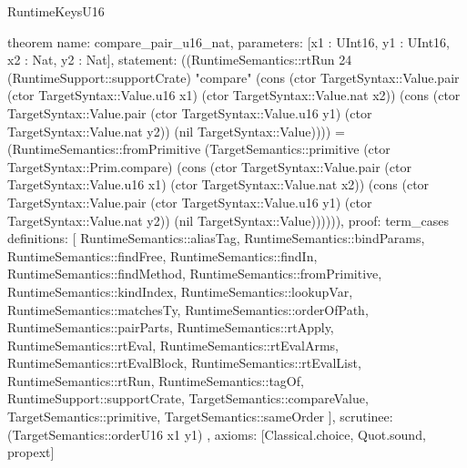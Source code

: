 \begin{lexlean}{RuntimeKeysU16}
\begin{semanticmodule}
theorem{
  name: compare_pair_u16_nat,
  parameters: [x1 : UInt16, y1 : UInt16, x2 : Nat, y2 : Nat],
  statement: ((RuntimeSemantics::rtRun 24 (RuntimeSupport::supportCrate) "compare" (cons (ctor TargetSyntax::Value.pair (ctor TargetSyntax::Value.u16 x1) (ctor TargetSyntax::Value.nat x2)) (cons (ctor TargetSyntax::Value.pair (ctor TargetSyntax::Value.u16 y1) (ctor TargetSyntax::Value.nat y2)) (nil TargetSyntax::Value)))) = (RuntimeSemantics::fromPrimitive (TargetSemantics::primitive (ctor TargetSyntax::Prim.compare) (cons (ctor TargetSyntax::Value.pair (ctor TargetSyntax::Value.u16 x1) (ctor TargetSyntax::Value.nat x2)) (cons (ctor TargetSyntax::Value.pair (ctor TargetSyntax::Value.u16 y1) (ctor TargetSyntax::Value.nat y2)) (nil TargetSyntax::Value)))))),
  proof: term_cases{
    definitions: [
      RuntimeSemantics::aliasTag,
      RuntimeSemantics::bindParams,
      RuntimeSemantics::findFree,
      RuntimeSemantics::findIn,
      RuntimeSemantics::findMethod,
      RuntimeSemantics::fromPrimitive,
      RuntimeSemantics::kindIndex,
      RuntimeSemantics::lookupVar,
      RuntimeSemantics::matchesTy,
      RuntimeSemantics::orderOfPath,
      RuntimeSemantics::pairParts,
      RuntimeSemantics::rtApply,
      RuntimeSemantics::rtEval,
      RuntimeSemantics::rtEvalArms,
      RuntimeSemantics::rtEvalBlock,
      RuntimeSemantics::rtEvalList,
      RuntimeSemantics::rtRun,
      RuntimeSemantics::tagOf,
      RuntimeSupport::supportCrate,
      TargetSemantics::compareValue,
      TargetSemantics::primitive,
      TargetSemantics::sameOrder
    ],
    scrutinee: (TargetSemantics::orderU16 x1 y1)
  },
  axioms: [Classical.choice, Quot.sound, propext]
}


\end{semanticmodule}
\end{lexlean}
